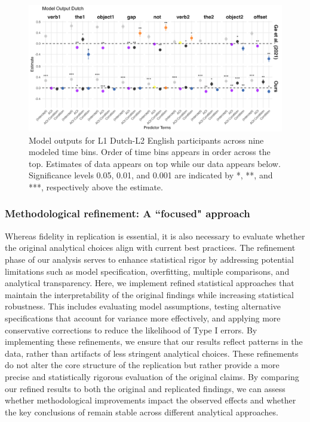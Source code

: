 \begin{figure}[H]  %
    \centering
    \includegraphics[width=\textwidth,height=\textheight,keepaspectratio]{viz/model_plot_dutch.png}
    \caption{Model outputs for L1 Dutch-L2 English participants across nine modeled time bins. Order of time bins appears in order across the top. Estimates of \cite{Ge2021} data appears on top while our data appears below. Significance levels 0.05, 0.01, and 0.001 are indicated by *, **, and ***, respectively above the estimate.}
    \label{fig:model_plot_dutch}
\end{figure}





\subsubsection{Methodological refinement: A ``focused" approach}

Whereas fidelity in replication is essential, it is also necessary to evaluate whether the original analytical choices align with current best practices. The refinement phase of our analysis serves to enhance statistical rigor by addressing potential limitations such as model specification, overfitting, multiple comparisons, and analytical transparency. Here, we implement refined statistical approaches that maintain the interpretability of the original findings while increasing statistical robustness. This includes evaluating model assumptions, testing alternative specifications that account for variance more effectively, and applying more conservative corrections to reduce the likelihood of Type I errors. By implementing these refinements, we ensure that our results reflect patterns in the data, rather than artifacts of less stringent analytical choices. These refinements do not alter the core structure of the replication but rather provide a more precise and statistically rigorous evaluation of the original claims. By comparing our refined results to both the original and replicated findings, we can assess whether methodological improvements impact the observed effects and whether the key conclusions of \cite{Ge2021} remain stable across different analytical approaches.

